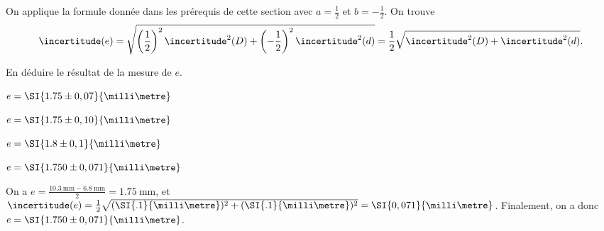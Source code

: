 \reponse{ \reponseA{}}

\begin{corrige}
On applique la formule donnée dans les prérequis de cette section avec $a=\frac12$ et $b=-\frac12$. On trouve \vspace{-1mm}
\[
\incertitude(e)= \sqrt{ 
\left( \frac12 \right)^2 \incertitude^2(D)+\left(-\frac12\right)^2 \incertitude^2(d)
}
=\frac12 \sqrt{\incertitude^2(D) + \incertitude^2(d) }.
\]
\end{corrige}



\begin{enonce}
En déduire le résultat de la mesure de \(e\).
\begin{listeQCM2Colonnes}
    \item \(e= \SI{1.75 \pm 0,07}{\milli\metre}\)
    \item \(e= \SI{1.75 \pm 0,10}{\milli\metre}\)
    \item \(e= \SI{1.8 \pm 0,1}{\milli\metre} \)
    \item \(e= \SI{1.750 \pm 0,071}{\milli\metre} \)
\end{listeQCM2Colonnes}
\smallskip
\end{enonce}

\reponse{\reponseD{}}

\begin{corrige}
On a \( e =  \frac{\SI{10,3}{\milli\metre}-\SI{6,8}{\milli\metre}}{2} = \SI{1.75}{\milli\metre} \), et \(\incertitude(e)= \frac12 \sqrt{(\SI{.1}{\milli\metre})^2 + (\SI{.1}{\milli\metre})^2 } = \SI{0,071}{\milli\metre} \). Finalement, on a donc \(e=\SI{1.750 \pm 0,071}{\milli\metre}\).
\end{corrige}


\finEntrainement






